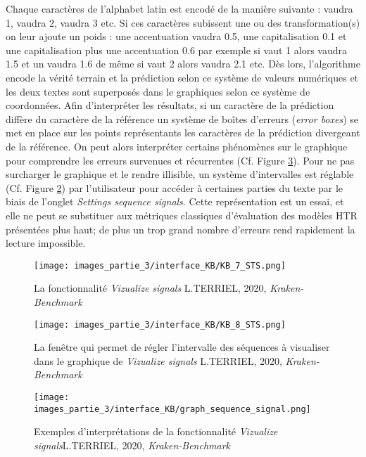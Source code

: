 Chaque caractères de l'alphabet latin est encodé de la manière suivante :  vaudra 1,  vaudra 2,  vaudra 3 etc. Si ces caractères subissent une ou des transformation(s) on leur ajoute un poids : une accentuation vaudra 0.5, une capitalisation 0.1 et une capitalisation plus une accentuation 0.6 par exemple si  vaut 1 alors  vaudra 1.5 et un  vaudra 1.6 de même si  vaut 2 alors  vaudra 2.1 etc. Dès lors, l'algorithme encode la vérité terrain et la prédiction selon ce système de valeurs numériques et les deux textes sont superposés dans le graphiques selon ce système de coordonnées. Afin d'interpréter les résultats, si un caractère de la prédiction diffère du caractère de la référence un système de boîtes d'erreurs (\textit{error boxes}) se met en place sur les points représentants les caractères de la prédiction divergeant de la référence. On peut alors interpréter certains phénomènes sur le graphique pour comprendre les erreurs survenues et récurrentes (Cf. Figure \ref{fig:accueil_KB_7}). Pour ne pas surcharger le graphique et le rendre illisible, un système d'intervalles est réglable (Cf. Figure \ref{fig:accueil_KB_6}) par l'utilisateur pour accéder à certaines parties du texte par le biais de l'onglet \textit{Settings sequence signals}. Cette représentation est un essai, et elle ne peut se substituer aux métriques classiques d'évaluation des modèles HTR présentées plus haut; de plus un trop grand nombre d'erreurs rend rapidement la lecture impossible.
\begin{figure}[h!]
    \centering
    \texttt{[image: images\_partie\_3/interface\_KB/KB\_7\_STS.png]}
        \caption{La fonctionnalité \textit{Vizualize signals} \textcopyright L.TERRIEL, 2020, \textit{Kraken-Benchmark}}
        \label{fig:accueil_KB_5}
\end{figure}
\begin{figure}[h]
    \centering
    \texttt{[image: images\_partie\_3/interface\_KB/KB\_8\_STS.png]}
        \caption{La fenêtre  qui permet de régler l'intervalle des séquences à visualiser dans le graphique de \textit{Vizualize signals} \textcopyright L.TERRIEL, 2020, \textit{Kraken-Benchmark}}
        \label{fig:accueil_KB_6}
\end{figure}
\begin{figure}[h]
    \centering
    \texttt{[image: images\_partie\_3/interface\_KB/graph\_sequence\_signal.png]}
        \caption{Exemples d'interprétations de la fonctionnalité  \textit{Vizualize signals}\textcopyright L.TERRIEL, 2020, \textit{Kraken-Benchmark}}
        \label{fig:accueil_KB_7}
\end{figure}

